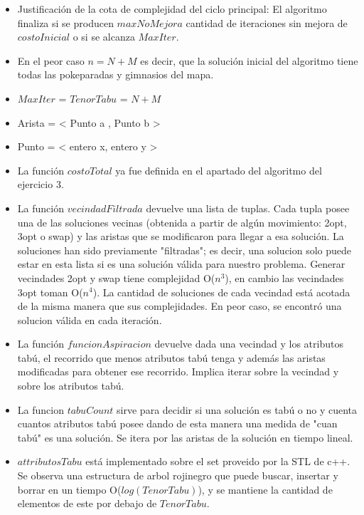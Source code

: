 \begin{itemize}
\item Justificación de la cota de complejidad del ciclo principal: El algoritmo finaliza si se producen $maxNoMejora$ cantidad de iteraciones sin mejora de $costoInicial$ o si se alcanza $MaxIter$. 
\item En el peor caso $n = N+M$ es decir, que la solución inicial del algoritmo tiene todas las pokeparadas y gimnasios del mapa.
\item $MaxIter$ = $TenorTabu$ = $N+M$
\item Arista = < Punto a , Punto b >
\item Punto = < entero x, entero y >
\item La función $costoTotal$ ya fue definida en el apartado del algoritmo del ejercicio 3.
\item La función $vecindadFiltrada$ devuelve una lista de tuplas. Cada tupla posee una de las soluciones vecinas (obtenida a partir de algún movimiento: 2opt, 3opt o swap) y las aristas que se modificaron para llegar a esa solución. La soluciones han sido previamente "filtradas"; es decir, una solucion solo puede estar en esta lista si es una solución válida para nuestro problema. Generar vecindades 2opt y swap tiene complejidad O($n^3$), en cambio las vecindades 3opt toman O($n^4$).
	La cantidad de soluciones de cada vecindad está acotada de la misma manera que sus complejidades. En peor caso, se encontró una solucion válida en cada iteraci\'on.
\item La función $funcionAspiracion$ devuelve dada una vecindad y los atributos tabú, el recorrido que menos atributos tabú tenga y además las aristas modificadas para obtener ese recorrido. Implica iterar sobre la vecindad y sobre los atributos tabú. 
\item La funcion $tabuCount$ sirve para decidir si una solución es tabú o no y cuenta cuantos atributos tabú posee dando de esta manera una medida de "cuan tabú" es una solución. Se itera por las aristas de la solución en tiempo lineal.
\item $attributosTabu$ está implementado sobre el set proveido por la STL de c++. Se observa una estructura de arbol rojinegro que puede buscar, insertar y borrar en un tiempo O($log(TenorTabu)$), y se mantiene la cantidad de elementos de este por debajo de $TenorTabu$.
\end{itemize}
